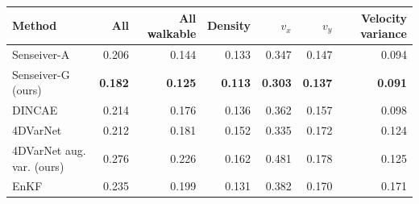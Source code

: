 \begin{tabular}{lrrrrrr}
\toprule
Method & All & All walkable & Density & $v_x$ & $v_y$ & Velocity variance \\
\midrule
Senseiver-A & 0.206 & 0.144 & 0.133 & 0.347 & 0.147 & 0.094 \\
Senseiver-G (ours) & \textbf{0.182} & \textbf{0.125} & \textbf{0.113} & \textbf{0.303} & \textbf{0.137} & \textbf{0.091} \\
DINCAE & 0.214 & 0.176 & 0.136 & 0.362 & 0.157 & 0.098 \\
4DVarNet & 0.212 & 0.181 & 0.152 & 0.335 & 0.172 & 0.124 \\
4DVarNet aug. var. (ours) & 0.276 & 0.226 & 0.162 & 0.481 & 0.178 & 0.125 \\
EnKF & 0.235 & 0.199 & 0.131 & 0.382 & 0.170 & 0.171 \\
\bottomrule
\end{tabular}
